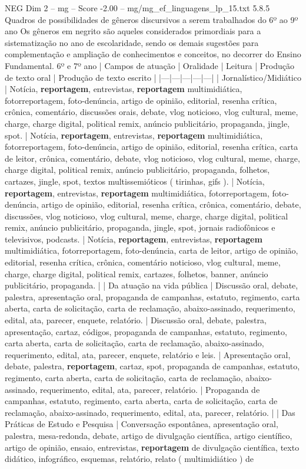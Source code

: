 \begin{textsample}{NEG Dim 2 – mg – Score -2.00 – mg/mg\_ef\_linguagens\_lp\_15.txt}  \label{ex:f2_neg_097}
5.8.5 Quadros de possibilidades de gêneros discursivos a serem trabalhados do 6º ao 9º ano Os gêneros em negrito são aqueles considerados primordiais para a sistematização no ano de escolaridade, sendo os demais sugestões para complementação e ampliação de conhecimentos e conceitos, no decorrer do Ensino Fundamental. 6º e 7º ano | Campos de atuação | Oralidade | Leitura | Produção de texto oral | Produção de texto escrito | |---|---|---|---|---| | Jornalístico/Midiático | Notícia, \textbf{reportagem}, entrevistas, \textbf{reportagem} multimidiática, fotorreportagem, foto-denúncia, artigo de opinião, editorial, resenha crítica, crônica, comentário, discussões orais, debate, vlog noticioso, vlog cultural, meme, charge, charge digital, political remix, anúncio publicitário, propaganda, jingle, spot. | Notícia, \textbf{reportagem}, entrevistas, \textbf{reportagem} multimidiática, fotorreportagem, foto-denúncia, artigo de opinião, editorial, resenha crítica, carta de leitor, crônica, comentário, debate, vlog noticioso, vlog cultural, meme, charge, charge digital, political remix, anúncio publicitário, propaganda, folhetos, cartazes, jingle, spot, textos multissemióticos ( tirinhas, gifs ). | Notícia, \textbf{reportagem}, entrevistas, \textbf{reportagem} multimidiática, fotorreportagem, foto-denúncia, artigo de opinião, editorial, resenha crítica, crônica, comentário, debate, discussões, vlog noticioso, vlog cultural, meme, charge, charge digital, political remix, anúncio publicitário, propaganda, jingle, spot, jornais radiofônicos e televisivos, podcasts. | Notícia, \textbf{reportagem}, entrevistas, \textbf{reportagem} multimidiática, fotorreportagem, foto-denúncia, carta de leitor, artigo de opinião, editorial, resenha crítica, crônica, comentário noticioso, vlog cultural, meme, charge, charge digital, political remix, cartazes, folhetos, banner, anúncio publicitário, propaganda. | | Da atuação na vida pública | Discussão oral, debate, palestra, apresentação oral, propaganda de campanhas, estatuto, regimento, carta aberta, carta de solicitação, carta de reclamação, abaixo-assinado, requerimento, edital, ata, parecer, enquete, relatório. | Discussão oral, debate, palestra, apresentação, cartaz, códigos, propaganda de campanhas, estatuto, regimento, carta aberta, carta de solicitação, carta de reclamação, abaixo-assinado, requerimento, edital, ata, parecer, enquete, relatório e leis. | Apresentação oral, debate, palestra, \textbf{reportagem}, cartaz, spot, propaganda de campanhas, estatuto, regimento, carta aberta, carta de solicitação, carta de reclamação, abaixo-assinado, requerimento, edital, ata, parecer, relatório. | Propaganda de campanhas, estatuto, regimento, carta aberta, carta de solicitação, carta de reclamação, abaixo-assinado, requerimento, edital, ata, parecer, relatório. | | Das Práticas de Estudo e Pesquisa | Conversação espontânea, apresentação oral, palestra, mesa-redonda, debate, artigo de divulgação científica, artigo científico, artigo de opinião, ensaio, entrevistas, \textbf{reportagem} de divulgação científica, texto didático, infográfico, esquemas, relatório, relato ( multimidiático ) de 
\end{textsample}
